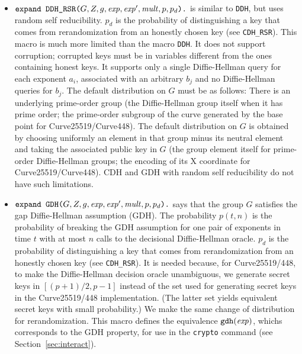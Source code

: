 \documentclass{article}
\begin{document}
\begin{itemize}
\begin{itemize}
\begin{itemize}
     \item $\texttt{expand\ DDH\_RSR(}G, Z, g, \mathit{exp}, \mathit{exp}',
       \mathit{mult}, p, p_d\texttt{).}$ is similar to \texttt{DDH}, but
       uses random self reducibility.  $p_d$ is the probability of
       distinguishing a key that comes from rerandomization from an
       honestly chosen key (see \texttt{CDH\_RSR}).  This macro is
       much more limited than the macro \texttt{DDH}. It does not
       support corruption; corrupted keys must be in variables
       different from the ones containing honest keys. It supports
       only a single Diffie-Hellman query for each exponent $a_i$,
       associated with an arbitrary $b_j$ and no Diffie-Hellman
       queries for $b_j$.  The default distribution on $G$ must be as
       follows: There is an underlying prime-order group (the
       Diffie-Hellman group itself when it has prime order; the
       prime-order subgroup of the curve generated by the base point
       for Curve25519/Curve448). The default distribution on $G$ is
       obtained by choosing uniformly an element in that group minus
       its neutral element and taking the associated public key in $G$
       (the group element itself for prime-order Diffie-Hellman
       groups; the encoding of its X coordinate for
       Curve25519/Curve448).  CDH and GDH with random self reducibility
       do not have such limitations.
   
     \item $\texttt{expand\ GDH(}G, Z, g, \mathit{exp}, \mathit{exp}',
       \mathit{mult}, p, p_d\texttt{).}$ says that the group $G$ satisfies
       the gap Diffie-Hellman assumption (GDH). The probability
       $p(t,n)$ is the probability of breaking the GDH assumption for
       one pair of exponents in time $t$ with at most $n$ calls to the
       decisional Diffie-Hellman oracle.  $p_d$ is the probability of
       distinguishing a key that comes from rerandomization from an
       honestly chosen key (see \texttt{CDH\_RSR}). It is needed
       because, for Curve25519/448, to make the Diffie-Hellman
       decision oracle unambiguous, we generate secret keys in
       $[(p+1)/2,p-1]$ instead of the set used for generating secret
       keys in the Curve25519/448 implementation.  (The latter set
       yields equivalent secret keys with small probability.) We make
       the same change of distribution for rerandomization.  This
       macro defines the equivalence $\texttt{gdh}(\mathit{exp})$, whichs
       corresponds to the GDH property, for use in the \texttt{crypto}
       command (see Section~\ref{sec:interact}).


\end{itemize}
\end{itemize}
\end{itemize}
\end{document}
